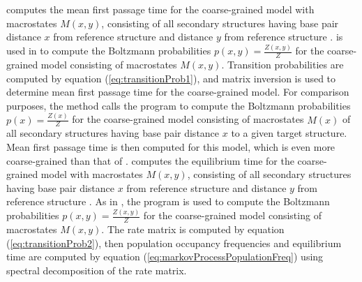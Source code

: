 \fftmfpt computes the mean first passage time
for the coarse-grained model with macrostates $M(x,y)$, consisting of
all secondary structures having base pair distance $x$ from reference
structure \strA and distance $y$ from reference structure \strB.
\ffttwo is used in \hermes to compute the Boltzmann probabilities
$p(x,y) = \frac{Z(x,y)}{Z}$ for the coarse-grained model consisting of
macrostates $M(x,y)$. Transition probabilities are computed by
equation (\ref{eq:transitionProb1}), and matrix inversion is used to
determine mean first passage time for the coarse-grained model.
For comparison purposes, the method \fftbor calls the
program \fftbor \cite{Senter.po12} to compute the Boltzmann probabilities
$p(x) = \frac{Z(x)}{Z}$ for the coarse-grained model consisting of
macrostates $M(x)$ of all secondary structures having base pair distance
$x$ to a given target structure. Mean first passage time is then computed
for this model, which is even more coarse-grained than that of \fftmfpt.
\ffteq computes the equilibrium time
for the coarse-grained model with macrostates $M(x,y)$, consisting of
all secondary structures having base pair distance $x$ from reference
structure \strA and distance $y$ from reference structure \strB. As in
\fftmfpt, the program
\ffttwo is used to compute the Boltzmann probabilities
$p(x,y) = \frac{Z(x,y)}{Z}$ for the coarse-grained model consisting of
macrostates $M(x,y)$. The rate matrix is computed by
equation (\ref{eq:transitionProb2}), then population occupancy
frequencies and equilibrium time
are computed by equation (\ref{eq:markovProcessPopulationFreq})
using spectral decomposition of the rate matrix.


